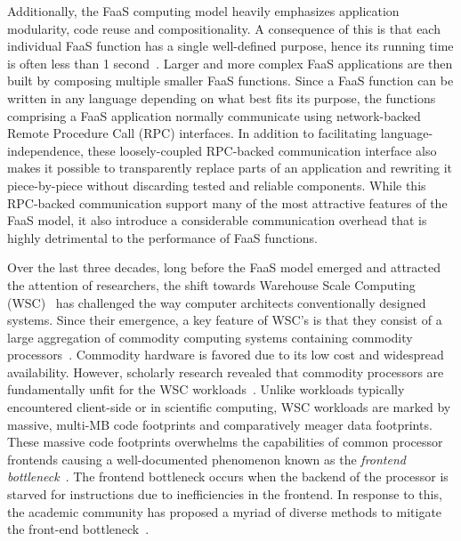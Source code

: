 \documentclass[../main.tex]{subfiles}
\begin{document}
\begin{refsection}
Additionally, the FaaS computing model heavily emphasizes application
modularity, code reuse and compositionality. A consequence of this is
that each individual FaaS function has a single well-defined purpose,
hence its running time is often less than 1
second~\cite{shahrad19_archit_implic_funct_servic_comput,mahgoub22_wisef,shahrad20_server_wild,lukewarm_serverless,du20_catal}.
Larger and more complex FaaS applications are then built by composing
multiple smaller FaaS functions. Since a FaaS function can be written
in any language depending on what best fits its purpose, the functions
comprising a FaaS application normally communicate using
network-backed Remote Procedure Call (RPC) interfaces. In addition to
facilitating language-independence, these loosely-coupled RPC-backed
communication interface also makes it possible to transparently
replace parts of an application and rewriting it piece-by-piece
without discarding tested and reliable components. While this
RPC-backed communication support many of the most attractive features
of the FaaS model, it also introduce a considerable communication
overhead that is highly detrimental to the performance of FaaS functions.

Over the last three decades, long before the FaaS model emerged and
attracted the attention of researchers, the shift towards Warehouse
Scale Computing (WSC)~\cite{barroso18_datac_as_comput} has challenged
the way computer architects conventionally designed systems. Since
their emergence, a key feature of WSC's is that they consist of a
large aggregation of commodity computing systems containing commodity
processors~\cite{barroso03_web_searc_planet}. Commodity hardware is
favored due to its low cost and widespread availability. However,
scholarly research revealed that commodity processors are
fundamentally unfit for the WSC
workloads~\cite{ferdman12_clear_cloud,kanev15_profil}. Unlike
workloads typically encountered client-side or in scientific
computing, WSC workloads are marked by massive, multi-MB code
footprints and comparatively meager data footprints. These massive
code footprints overwhelms the capabilities of common processor
frontends causing a well-documented phenomenon known as the
\emph{frontend
  bottleneck}~\cite{ailamaki99_dbmss_moder_proces,keeton98_perfor_charac_quad_pentium_pro,ranganathan98_perfor_datab_workl_shared_memor}. The
frontend bottleneck occurs when the backend of the processor is
starved for instructions due to inefficiencies in the frontend. In
response to this, the academic community has proposed a myriad of
diverse methods to mitigate the front-end
bottleneck~\cite{reinman99_fetch_direc_instr_prefet,kumar17_boomer,kumar18_blast_throug_front_end_bottl_with_shotg,kumar20_shoot_down_server_front_end_bottl,ferdman08_tempor,ferdman11_proac_instr_fetch,kaynak13_shift,kaynak15_confl,ayers19_asmdb,ajorpaz18_explor_predic_replac_polic_instr,khan20_i_spy,soundararajan21_pdede,ansari20_divid,khan21_rippl,}.


\end{refsection}
\end{document}

